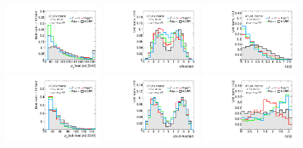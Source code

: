 \begin{figure}[tp]
  \centering
  \includegraphics[width=0.32\textwidth]{figures/overlaid/vbf/jet-1-pt}
  \includegraphics[width=0.32\textwidth]{figures/overlaid/vbf/jet-1-eta}
  \includegraphics[width=0.32\textwidth]{figures/overlaid/vbf/jets-deta} \\
  \includegraphics[width=0.32\textwidth]{figures/overlaid/vbf/jet-2-pt} 
  \includegraphics[width=0.32\textwidth]{figures/overlaid/vbf/jet-2-eta}
  \includegraphics[width=0.32\textwidth]{figures/overlaid/vbf/jets-dphi} \\

\end{figure}
